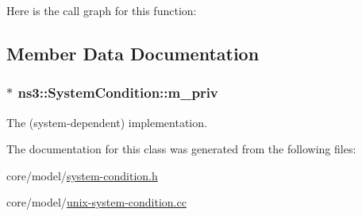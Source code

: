 Here is the call graph for this function\+:




\subsection{Member Data Documentation}
\subsubsection[{\texorpdfstring{m\+\_\+priv}{m_priv}}]{$\ast$ ns3\+::\+System\+Condition\+::m\+\_\+priv\hspace{0.3cm}{\ttfamily [private]}}\hypertarget{classns3_1_1SystemCondition_abedcdf182d9c7b51958191d18d61f295}{}\label{classns3_1_1SystemCondition_abedcdf182d9c7b51958191d18d61f295}
The (system-\/dependent) implementation. 

The documentation for this class was generated from the following files\+:\begin{DoxyCompactItemize}
\item 
core/model/\hyperlink{system-condition_8h}{system-\/condition.\+h}\item 
core/model/\hyperlink{unix-system-condition_8cc}{unix-\/system-\/condition.\+cc}\end{DoxyCompactItemize}
